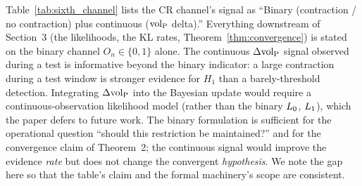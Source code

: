 \begin{remark}
\label{rem:continuous_signal}
Table~\ref{tab:sixth_channel} lists the CR channel's signal as
``Binary (contraction / no contraction) plus continuous
(${\operatorname{vol}_{\mathrm{P}}}$ delta).''  Everything downstream of Section~3 (the
likelihoods, the KL rates, Theorem~\ref{thm:convergence}) is
stated on the binary channel $O_n \in \{0, 1\}$ alone.  The
continuous $\Delta{\operatorname{vol}_{\mathrm{P}}}$ signal observed during a test is
informative beyond the binary indicator: a large contraction
during a test window is stronger evidence for $H_1$ than a
barely-threshold detection.  Integrating $\Delta{\operatorname{vol}_{\mathrm{P}}}$ into the
Bayesian update would require a continuous-observation likelihood
model (rather than the binary $L_0$, $L_1$), which the
paper defers to future work.  The binary formulation is
sufficient for the operational question ``should this restriction
be maintained?'' and for the convergence claim of Theorem~2; the
continuous signal would improve the evidence \emph{rate} but
does not change the convergent \emph{hypothesis}.  We note the
gap here so that the table's claim and the formal machinery's
scope are consistent.
\end{remark}

